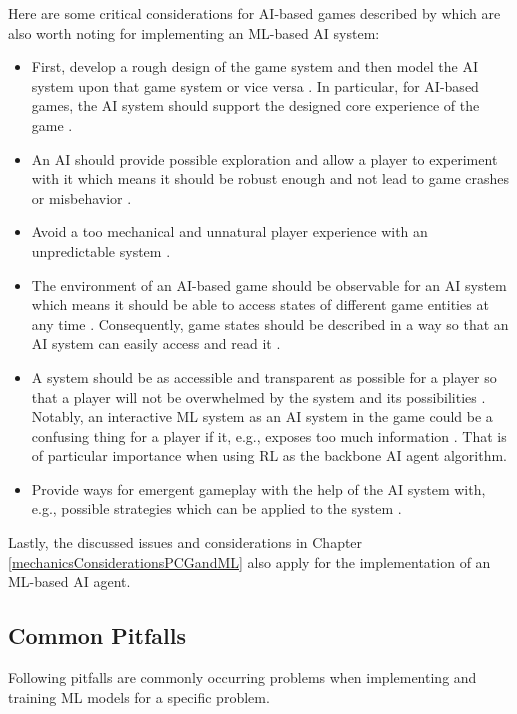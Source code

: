 \documentclass[MGS,Master,english]{twbook}%
\begin{document}
Here are some critical considerations for \ac{AI}-based games described by \citep{ai::gameDesign} which are also worth noting for implementing an \ac{ML}-based \ac{AI} system: 
\begin{itemize}
	\item First, develop a rough design of the game system and then model the \ac{AI} system upon that game system or vice versa \cite{ai::gameDesign}. In particular, for \ac{AI}-based games, the \ac{AI} system should support the designed core experience of the game \cite{ai::gameDesign}.
	\item An \ac{AI} should provide possible exploration and allow a player to experiment with it which means it should be robust enough and not lead to game crashes or misbehavior \cite{ai::gameDesign}. 
	\item Avoid a too mechanical and unnatural player experience with an unpredictable system \cite{ai::gameDesign}.
	\item The environment of an \ac{AI}-based game should be observable for an \ac{AI} system which means it should be able to access states of different game entities at any time \cite{ai::gameDesign}. Consequently, game states should be described in a way so that an \ac{AI} system can easily access and read it \cite{ai::book}.
	\item A system should be as accessible and transparent as possible for a player so that a player will not be overwhelmed by the system and its possibilities \cite{ai::gameDesign}. Notably, an interactive \ac{ML} system as an \ac{AI} system in the game could be a confusing thing for a player if it, e.g., exposes too much information \cite{ai::gameDesign}. That is of particular importance when using \ac{RL} as the backbone \ac{AI} agent algorithm.
	\item Provide ways for emergent gameplay with the help of the \ac{AI} system with, e.g., possible strategies which can be applied to the system \cite{ai::gameDesign}. 
\end{itemize}

Lastly, the discussed issues and considerations in Chapter \ref{mechanicsConsiderationsPCGandML} also apply for the implementation of an \ac{ML}-based \ac{AI} agent.

\subsection{Common Pitfalls}
Following pitfalls are commonly occurring problems when implementing and training \ac{ML} models for a specific problem.
\end{document}
